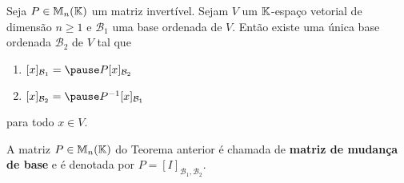 \documentclass{beamer}
\begin{document}
    \begin{frame}
        \begin{teorema}
            Seja $P \in \mathbb{M}_n(\mathbb{K})$ um matriz invertível. \pause Sejam $V$ um $\mathbb{K}$-espaço vetorial de dimensão $n \ge 1$ \pause
            e $\mathcal{B}_1$ uma base ordenada de $V$. \pause Então existe uma única base ordenada $\mathcal{B}_2$ \pause de $V$
            tal que\pause
            \begin{enumerate}[label={\roman*})]
                \vspace*{.25cm}
                \item $[x]_{\mathcal{B}_1} = \pause P[x]_{\mathcal{B}_2}$\pause

                \vspace{.75cm}

                \item $[x]_{\mathcal{B}_2} = \pause P^{-1}[x]_{\mathcal{B}_1}$\pause
            \end{enumerate}

            \vspace{.2cm}

            para todo $x \in V$.
        \end{teorema}
    \end{frame}

    \begin{frame}
        \begin{definicao}
            A matriz $P \in \mathbb{M}_n(\mathbb{K})$ \pause do Teorema anterior \pause é chamada de \textbf{matriz de mudança de base} \pause e é
            denotada por $P = [I]_{{\mathcal{B}_1},{\mathcal{B}_2}}$.
        \end{definicao}
    \end{frame}
\end{document}

